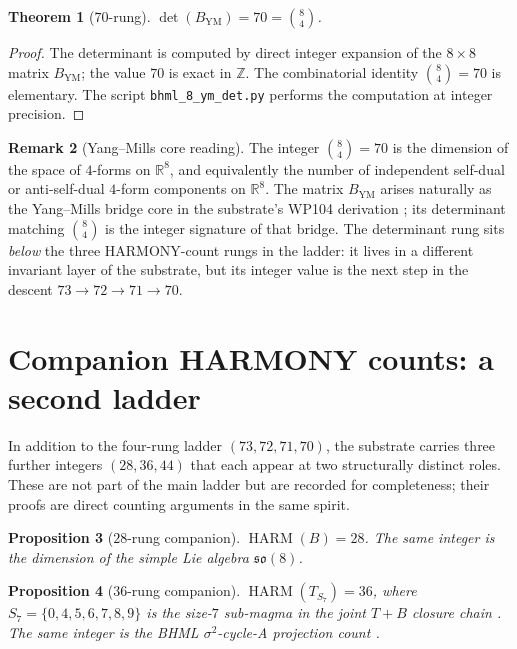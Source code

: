 \documentclass[11pt,reqno]{amsart}
\newtheorem{theorem}{Theorem}[section]
\newtheorem{proposition}[theorem]{Proposition}
\theoremstyle{definition}
\newtheorem{remark}[theorem]{Remark}
\newcommand{\Z}{\mathbb{Z}}
\newcommand{\R}{\mathbb{R}}
\DeclareMathOperator{\HARM}{HARM}
\begin{document}
\begin{theorem}[$70$-rung]
\label{thm:70}
$\det(B_{\mathrm{YM}}) = 70 = \binom{8}{4}$.
\end{theorem}

\begin{proof}
The determinant is computed by direct integer expansion of the
$8 \times 8$ matrix $B_{\mathrm{YM}}$; the value $70$ is exact in
$\Z$. The combinatorial identity $\binom{8}{4} = 70$ is elementary.
The script \texttt{bhml\_8\_ym\_det.py} performs the computation at
integer precision.
\end{proof}

\begin{remark}[Yang--Mills core reading]
\label{rem:70-reading}
The integer $\binom{8}{4} = 70$ is the dimension of the space of
$4$-forms on $\R^8$, and equivalently the number of independent
self-dual or anti-self-dual $4$-form components on $\R^8$. The
matrix $B_{\mathrm{YM}}$ arises naturally as the Yang--Mills bridge
core in the substrate's WP104 derivation
\cite{Sanders2026YangMills}; its determinant matching $\binom{8}{4}$
is the integer signature of that bridge. The determinant rung sits
\emph{below} the three HARMONY-count rungs in the ladder: it lives
in a different invariant layer of the substrate, but its integer
value is the next step in the descent $73 \to 72 \to 71 \to 70$.
\end{remark}

\section{Companion HARMONY counts: a second ladder}
\label{sec:companion}

In addition to the four-rung ladder $(73, 72, 71, 70)$, the substrate
carries three further integers $(28, 36, 44)$ that each appear at
two structurally distinct roles. These are not part of the main
ladder but are recorded for completeness; their proofs are
direct counting arguments in the same spirit.

\begin{proposition}[$28$-rung companion]
\label{prop:28}
$\HARM(B) = 28$. The same integer is the dimension of the simple Lie
algebra $\mathfrak{so}(8)$.
\end{proposition}

\begin{proposition}[$36$-rung companion]
\label{prop:36}
$\HARM(T_{S_7}) = 36$, where $S_7 = \{0, 4, 5, 6, 7, 8, 9\}$ is the
size-$7$ sub-magma in the joint $T+B$ closure chain
\cite{Sanders2026FourCore}. The same integer is the BHML
$\sigma^2$-cycle-A projection count
\cite{Sanders2026LensInvariance}.
\end{proposition}
\end{document}
